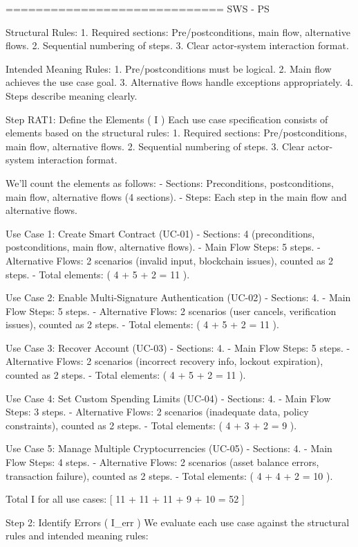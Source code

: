 =============================
SWS - PS

Structural Rules:
1. Required sections: Pre/postconditions, main flow, alternative flows.
2. Sequential numbering of steps.
3. Clear actor-system interaction format.

Intended Meaning Rules:
1. Pre/postconditions must be logical.
2. Main flow achieves the use case goal.
3. Alternative flows handle exceptions appropriately.
4. Steps describe meaning clearly.

Step  RAT1: Define the Elements ( I )
Each use case specification consists of elements based on the structural rules:
1. Required sections: Pre/postconditions, main flow, alternative flows.
2. Sequential numbering of steps.
3. Clear actor-system interaction format.

We’ll count the elements as follows:
- Sections: Preconditions, postconditions, main flow, alternative flows (4 sections).
- Steps: Each step in the main flow and alternative flows.

Use Case 1: Create Smart Contract (UC-01)
- Sections: 4 (preconditions, postconditions, main flow, alternative flows).
- Main Flow Steps: 5 steps.
- Alternative Flows: 2 scenarios (invalid input, blockchain issues), counted as 2 steps.
- Total elements: ( 4 + 5 + 2 = 11 ).

Use Case 2: Enable Multi-Signature Authentication (UC-02)
- Sections: 4.
- Main Flow Steps: 5 steps.
- Alternative Flows: 2 scenarios (user cancels, verification issues), counted as 2 steps.
- Total elements: ( 4 + 5 + 2 = 11 ).

Use Case 3: Recover Account (UC-03)
- Sections: 4.
- Main Flow Steps: 5 steps.
- Alternative Flows: 2 scenarios (incorrect recovery info, lockout expiration), counted as 2 steps.
- Total elements: ( 4 + 5 + 2 = 11 ).

Use Case 4: Set Custom Spending Limits (UC-04)
- Sections: 4.
- Main Flow Steps: 3 steps.
- Alternative Flows: 2 scenarios (inadequate data, policy constraints), counted as 2 steps.
- Total elements: ( 4 + 3 + 2 = 9 ).

Use Case 5: Manage Multiple Cryptocurrencies (UC-05)
- Sections: 4.
- Main Flow Steps: 4 steps.
- Alternative Flows: 2 scenarios (asset balance errors, transaction failure), counted as 2 steps.
- Total elements: ( 4 + 4 + 2 = 10 ).

Total I for all use cases:
[
11 + 11 + 11 + 9 + 10 = 52
]

Step 2: Identify Errors ( I_err )
We evaluate each use case against the structural rules and intended meaning rules:

